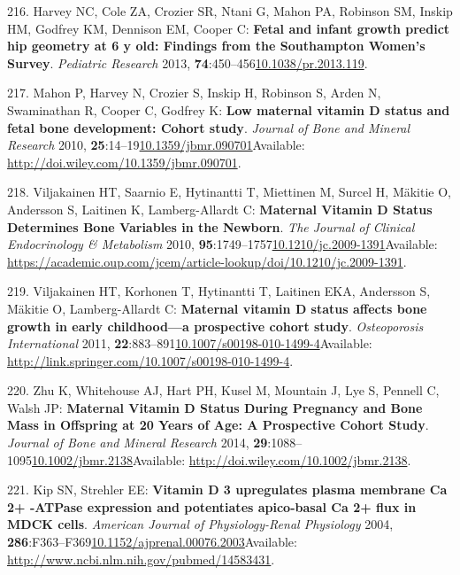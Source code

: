 \documentclass[
]{book}
\begin{document}
\leavevmode\hypertarget{ref-Harvey2013}{}%
216. Harvey NC, Cole ZA, Crozier SR, Ntani G, Mahon PA, Robinson SM, Inskip HM, Godfrey KM, Dennison EM, Cooper C: \textbf{Fetal and infant growth predict hip geometry at 6 y old: Findings from the Southampton Women's Survey}. \emph{Pediatric Research} 2013, \textbf{74}:450--456\href{https://doi.org/10.1038/pr.2013.119}{10.1038/pr.2013.119}.

\leavevmode\hypertarget{ref-Mahon2010a}{}%
217. Mahon P, Harvey N, Crozier S, Inskip H, Robinson S, Arden N, Swaminathan R, Cooper C, Godfrey K: \textbf{Low maternal vitamin D status and fetal bone development: Cohort study}. \emph{Journal of Bone and Mineral Research} 2010, \textbf{25}:14--19\href{https://doi.org/10.1359/jbmr.090701}{10.1359/jbmr.090701}Available: \url{http://doi.wiley.com/10.1359/jbmr.090701}.

\leavevmode\hypertarget{ref-Viljakainen2010}{}%
218. Viljakainen HT, Saarnio E, Hytinantti T, Miettinen M, Surcel H, Mäkitie O, Andersson S, Laitinen K, Lamberg-Allardt C: \textbf{Maternal Vitamin D Status Determines Bone Variables in the Newborn}. \emph{The Journal of Clinical Endocrinology \& Metabolism} 2010, \textbf{95}:1749--1757\href{https://doi.org/10.1210/jc.2009-1391}{10.1210/jc.2009-1391}Available: \url{https://academic.oup.com/jcem/article-lookup/doi/10.1210/jc.2009-1391}.

\leavevmode\hypertarget{ref-Viljakainen2011}{}%
219. Viljakainen HT, Korhonen T, Hytinantti T, Laitinen EKA, Andersson S, Mäkitie O, Lamberg-Allardt C: \textbf{Maternal vitamin D status affects bone growth in early childhood---a prospective cohort study}. \emph{Osteoporosis International} 2011, \textbf{22}:883--891\href{https://doi.org/10.1007/s00198-010-1499-4}{10.1007/s00198-010-1499-4}Available: \url{http://link.springer.com/10.1007/s00198-010-1499-4}.

\leavevmode\hypertarget{ref-Zhu2014a}{}%
220. Zhu K, Whitehouse AJ, Hart PH, Kusel M, Mountain J, Lye S, Pennell C, Walsh JP: \textbf{Maternal Vitamin D Status During Pregnancy and Bone Mass in Offspring at 20 Years of Age: A Prospective Cohort Study}. \emph{Journal of Bone and Mineral Research} 2014, \textbf{29}:1088--1095\href{https://doi.org/10.1002/jbmr.2138}{10.1002/jbmr.2138}Available: \url{http://doi.wiley.com/10.1002/jbmr.2138}.

\leavevmode\hypertarget{ref-Kip2004}{}%
221. Kip SN, Strehler EE: \textbf{Vitamin D 3 upregulates plasma membrane Ca 2+ -ATPase expression and potentiates apico-basal Ca 2+ flux in MDCK cells}. \emph{American Journal of Physiology-Renal Physiology} 2004, \textbf{286}:F363--F369\href{https://doi.org/10.1152/ajprenal.00076.2003}{10.1152/ajprenal.00076.2003}Available: \url{http://www.ncbi.nlm.nih.gov/pubmed/14583431}.
\end{document}
